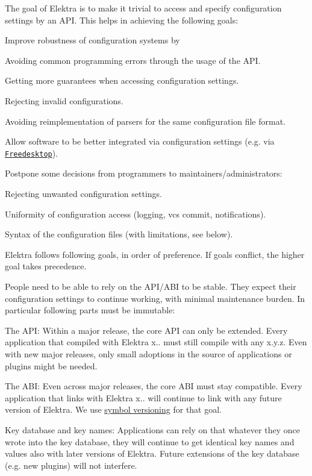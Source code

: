 The goal of Elektra is to make it trivial to access and specify configuration settings by an A\+PI. This helps in achieving the following goals\+:


\begin{DoxyItemize}
\item Improve robustness of configuration systems by
\begin{DoxyItemize}
\item Avoiding common programming errors through the usage of the A\+PI.
\item Getting more guarantees when accessing configuration settings.
\item Rejecting invalid configurations.
\item Avoiding reimplementation of parsers for the same configuration file format.
\end{DoxyItemize}
\item Allow software to be better integrated via configuration settings (e.\+g. via \href{https://www.freedesktop.org}{\tt Freedesktop}).
\item Postpone some decisions from programmers to maintainers/administrators\+:
\begin{DoxyItemize}
\item Rejecting unwanted configuration settings.
\item Uniformity of configuration access (logging, vcs commit, notifications).
\item Syntax of the configuration files (with limitations, see below).
\end{DoxyItemize}
\end{DoxyItemize}

Elektra follows following goals, in order of preference. If goals conflict, the higher goal takes precedence.

People need to be able to rely on the A\+P\+I/\+A\+BI to be stable. They expect their configuration settings to continue working, with minimal maintenance burden. In particular following parts must be immutable\+:


\begin{DoxyItemize}
\item The A\+PI\+: Within a major release, the core A\+PI can only be extended. Every application that compiled with Elektra {\ttfamily x..} must still compile with any {\ttfamily x.\+y.\+z}. Even with new major releases, only small adoptions in the source of applications or plugins might be needed.
\item The A\+BI\+: Even across major releases, the core A\+BI must stay compatible. Every application that links with Elektra {\ttfamily x..} will continue to link with any future version of Elektra. We use \hyperlink{doc_dev_symbol-versioning_md}{symbol versioning} for that goal.
\item Key database and key names\+: Applications can rely on that whatever they once wrote into the key database, they will continue to get identical key names and values also with later versions of Elektra. Future extensions of the key database (e.\+g. new plugins) will not interfere.
\end{DoxyItemize}

